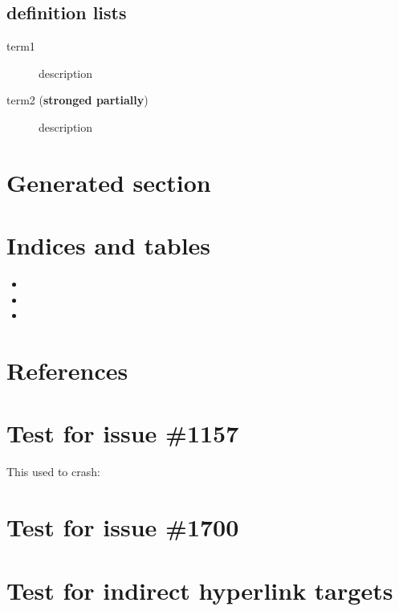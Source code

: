 \documentclass[letterpaper,10pt,english]{sphinxhowto}
\begin{document}
\subsection{definition lists}
\label{lists:definition-lists}\begin{description}
\item[{term1}] \leavevmode
description

\item[{term2 (\textbf{stronged partially})}] \leavevmode
description

\end{description}


\section{Generated section}
\label{otherext::doc}\label{otherext:id1}

\section{Indices and tables}
\label{contents:indices-and-tables}\begin{itemize}
\item {} 

\item {} 

\item {} 

\end{itemize}


\section{References}
\label{contents:references}

\section{Test for issue \#1157}
\label{contents:test-for-issue-1157}
This used to crash:


\section{Test for issue \#1700}
\label{contents:test-for-issue-1700}
{\hyperref[contents:mastertoc]{}}


\section{Test for indirect hyperlink targets}
\label{contents:test-for-indirect-hyperlink-targets}
{\hyperref[markup:some\string-label]{}}
\end{document}

